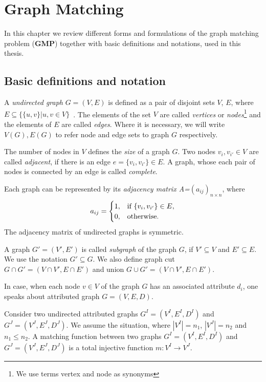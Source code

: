 
\chapter{Graph Matching}

In this chapter we review different forms and formulations of the graph matching problem (\textbf{GMP}) together with basic definitions and notations, used in this thesis. 

\section{Basic definitions and notation}
A \emph{undirected graph} $G=(V,E)$ is defined as a pair of disjoint sets $V$, $E$, where $E\subseteq\{\{u,v\}| u, v\in V\}$~\cite{Diestel2000}. The elements of the set $V$ are called \emph{vertices} or \emph{nodes}\footnote{We use terms vertex and node as synonyms} and the elements of $E$ are called \emph{edges}. Where it is necessary, we will write $V(G), E(G)$ to refer node and edge sets to graph $G$ respectively.

The number of nodes in $V$ defines the \emph{size} of a graph $G$.
Two nodes $v_{i},v_{i'}\in V$ are called \emph{adjacent}, if there is an edge $e=\{v_{i},v_{i'}\}\in E$. A graph, whose each pair of nodes is connected by an edge is called \emph{complete}.

Each graph can be represented by its \emph{adjacency matrix A=$(a_{ij})_{n\times n}$}, where 
\begin{equation*}\centering
a_{ij}=\begin{cases}
 1, & \text{if } \{v_{i},v_{i'}\}\in E, \\
 0, & \text{otherwise.} \\
\end{cases}
\end{equation*}
The adjacency matrix of undirected graphs is symmetric.

A graph $G'=(V',E')$ is called \emph{subgraph} of the graph $G$, if $V'\subseteq V$ and $E'\subseteq E$. We use the notation $G'\subseteq G$. We also define graph cut $G\cap G'=(V\cap V', E\cap E')$ and union $G\cup G'=(V\cap V', E\cap E')$.

In case, when each node $v\in V$ of the graph $G$ has an associated attribute $d_i$, one speaks about attributed graph $G=(V,E,D)$.

Consider two undirected attributed graphs $G^I = (V^I, E^I, D^I)$ and $G^J = (V^J, E^J, D^J)$. We assume the situation, where $|V^I|=n_1$, $|V^J|=n_2$ and $n_1\le n_2$. A matching function between two graphs $G^I=(V^I,E^I,D^I)$ and $G^J=(V^J,E^J,D^J)$ is a total injective function $m:V^I\rightarrow V^J$.

